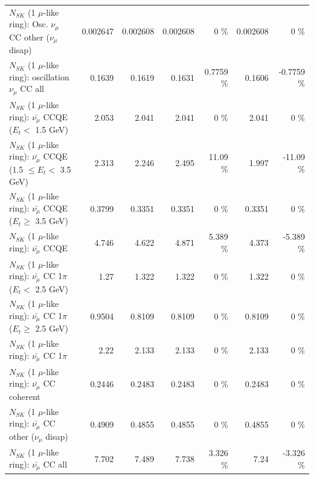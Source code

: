 \begin{table}
\begin{tabular}{| l | r | r | r  r | r  r |}
         $N_{SK}$ (1 $\mu$-like ring): Osc. $\nu_\mu$ CC other ($\nu_\mu$ disap) &        0.002647 &        0.002608 &        0.002608 &        0 \%  &        0.002608 &        0 \%  \\ 
                      $N_{SK}$ (1 $\mu$-like ring): oscillation $\nu_\mu$ CC all &          0.1639 &          0.1619 &          0.1631 &   0.7759 \%  &          0.1606 &  -0.7759 \%  \\ 
\hline
\hline
          $N_{SK}$ (1 $\mu$-like ring): $\bar{\nu_\mu}$ CCQE ($E_{t} <$ 1.5 GeV) &           2.053 &           2.041 &           2.041 &        0 \%  &           2.041 &        0 \%  \\ 
 $N_{SK}$ (1 $\mu$-like ring): $\bar{\nu_\mu}$ CCQE (1.5 $\leq E_{t} <$ 3.5 GeV) &           2.313 &           2.246 &           2.495 &    11.09 \%  &           1.997 &   -11.09 \%  \\ 
       $N_{SK}$ (1 $\mu$-like ring): $\bar{\nu_\mu}$ CCQE ($E_{t} \geq$ 3.5 GeV) &          0.3799 &          0.3351 &          0.3351 &        0 \%  &          0.3351 &        0 \%  \\ 
\hline
                              $N_{SK}$ (1 $\mu$-like ring): $\bar{\nu_\mu}$ CCQE &           4.746 &           4.622 &           4.871 &    5.389 \%  &           4.373 &   -5.389 \%  \\ 
\hline
     $N_{SK}$ (1 $\mu$-like ring): $\bar{\nu_\mu}$ CC 1$\pi$ ($E_{t} <$ 2.5 GeV) &            1.27 &           1.322 &           1.322 &        0 \%  &           1.322 &        0 \%  \\ 
  $N_{SK}$ (1 $\mu$-like ring): $\bar{\nu_\mu}$ CC 1$\pi$ ($E_{t} \geq$ 2.5 GeV) &          0.9504 &          0.8109 &          0.8109 &        0 \%  &          0.8109 &        0 \%  \\ 
\hline
                         $N_{SK}$ (1 $\mu$-like ring): $\bar{\nu_\mu}$ CC 1$\pi$ &            2.22 &           2.133 &           2.133 &        0 \%  &           2.133 &        0 \%  \\ 
                       $N_{SK}$ (1 $\mu$-like ring): $\bar{\nu_\mu}$ CC coherent &          0.2446 &          0.2483 &          0.2483 &        0 \%  &          0.2483 &        0 \%  \\ 
        $N_{SK}$ (1 $\mu$-like ring): $\bar{\nu_\mu}$ CC other ($\nu_\mu$ disap) &          0.4909 &          0.4855 &          0.4855 &        0 \%  &          0.4855 &        0 \%  \\ 
                          $N_{SK}$ (1 $\mu$-like ring): $\bar{\nu_{\mu}}$ CC all &           7.702 &           7.489 &           7.738 &    3.326 \%  &            7.24 &   -3.326 \%  \\ 

\end{tabular}
\end{table}
